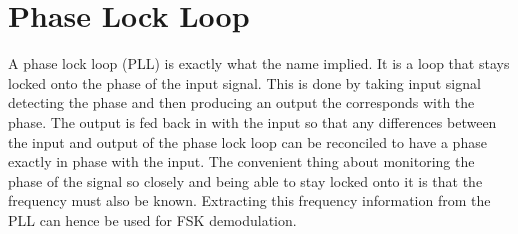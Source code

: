 \section{Phase Lock Loop}
A phase lock loop (PLL) is exactly what the name implied. It is a loop that stays locked onto the phase of the input signal. This is done by taking input signal detecting the phase and then producing an output the corresponds with the phase. The output is fed back in with the input so that any differences between the input and output of the phase lock loop can be reconciled to have a phase exactly in phase with the input. The convenient thing about monitoring the phase of the signal so closely and being able to stay locked onto it is that the frequency must also be known. Extracting this frequency information from the PLL can hence be used for FSK demodulation.

